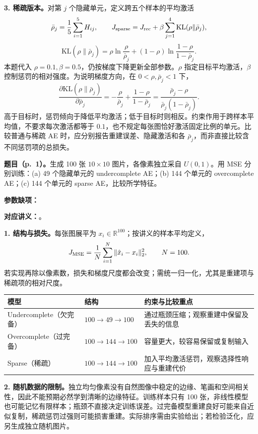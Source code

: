 \textbf{3. 稀疏版本。}对第 $j$ 个隐藏单元，定义跨五个样本的平均激活
\[
\bar\rho_j=\frac15\sum_{i=1}^{5}H_{ij},\qquad
J_{\rm sparse}=J_{\rm rec}+\beta\sum_{j=1}^{4}\mathrm{KL}(\rho\|\bar\rho_j),
\]
\[
\mathrm{KL}(\rho\|\bar\rho_j)=
\rho\ln\frac{\rho}{\bar\rho_j}
+(1-\rho)\ln\frac{1-\rho}{1-\bar\rho_j}.
\]
本题代入 $\rho=0.1,\beta=0.5$，仍按梯度下降更新全部参数。$\rho$ 指定目标平均激活，$\beta$ 控制惩罚的相对强度。为说明梯度方向，在 $0<\rho,\bar\rho_j<1$ 下，
\[
\frac{\partial\mathrm{KL}(\rho\|\bar\rho_j)}{\partial\bar\rho_j}
=-\frac{\rho}{\bar\rho_j}+\frac{1-\rho}{1-\bar\rho_j}
=\frac{\bar\rho_j-\rho}{\bar\rho_j(1-\bar\rho_j)}.
\]
高于目标时，惩罚倾向于降低平均激活；低于目标时则相反。约束作用于跨样本平均值，不要求每次激活都等于 $0.1$，也不规定每张图恰好激活固定比例的单元。比较普通与稀疏 AE 时，应分别报告重建误差、隐藏激活和各 $\bar\rho_j$，而非直接比较含不同惩罚项的总损失。

\nopagebreak[4]
\textbf{题目（p.~1）。}生成 100 张 $10\times10$ 图片，各像素独立采自 $U(0,1)$。用 MSE 分别训练：(a) 49 个隐藏单元的 undercomplete AE；(b) 144 个单元的 overcomplete AE；(c) 144 个单元的 sparse AE，比较所学特征。

\textbf{参数缺项：}

\textbf{对应讲义：}。

\textbf{1. 结构与损失。}每张图展平为 $x_i\in\mathbb R^{100}$；按讲义的样本平均定义，
\[
J_{\rm MSE}=\frac1N\sum_{i=1}^{N}\|\hat x_i-x_i\|_2^2,\qquad N=100.
\]
若实现再除以像素数，损失和梯度尺度都会改变；需统一归一化，尤其是重建项与稀疏项的相对尺度。
\begin{center}
\small
\begin{tabularx}{\textwidth}{@{}l l X@{}}
\toprule
模型 & 结构 & 约束与比较重点 \\
\midrule
Undercomplete（欠完备） & $100\to49\to100$ & 通过瓶颈压缩；观察重建中保留及丢失的信息 \\
Overcomplete（过完备） & $100\to144\to100$ & 容量更大，较容易保留或复制输入 \\
Sparse（稀疏） & $100\to144\to100$ & 加入平均激活惩罚，观察选择性响应与重建代价 \\
\bottomrule
\end{tabularx}
\end{center}

\textbf{2. 随机数据的限制。}独立均匀像素没有自然图像中稳定的边缘、笔画和空间相关性，因此不能预期必然学到清晰的边缘特征。训练样本只有 100 张，非线性模型也可能记忆有限样本；瓶颈不直接决定训练误差。过完备模型重建良好可能来自近似复制，稀疏惩罚过强则可能损害重建。实际排序需由实验给出；若检验泛化，应另生成独立随机图片。

